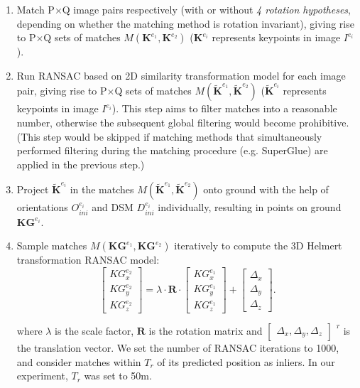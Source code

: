\begin{enumerate}
    \item Match P$\times$Q image pairs respectively (with or without \textit{4 rotation hypotheses}, depending on whether the matching method is rotation invariant), giving rise to P$\times$Q sets of matches $M({\mathbf{K}^{e_1},\mathbf{K}^{e_2}})$ ($\mathbf{K}^{e_i}$ represents keypoints in image $I^{e_i}$).
    \item Run RANSAC based on 2D similarity transformation model for each image pair, giving rise to P$\times$Q sets of matches $M({\mathbf{\widetilde{K}}^{e_1},\mathbf{\widetilde{K}}^{e_2}})$ ($\mathbf{\widetilde{K}}^{e_i}$ represents keypoints in image $I^{e_i}$). This step aims to filter matches into a reasonable number, otherwise the subsequent global filtering would become prohibitive. (This step would be skipped if matching methods that simultaneously performed filtering during the matching procedure (e.g. SuperGlue) are applied in the previous step.)
    \item Project $\mathbf{\widetilde{K}}^{e_i}$ in the matches $M({\mathbf{\widetilde{K}}^{e_1},\mathbf{\widetilde{K}}^{e_2}})$ onto ground with the help of orientations $O_{ini}^{e_i}$ and DSM $D_{ini}^{e_i}$ individually, resulting in points on ground $\mathbf{KG}^{e_i}$.
    \item Sample matches $M({\mathbf{KG}^{e_1},\mathbf{KG}^{e_2}})$ iteratively to compute the 3D Helmert transformation RANSAC model:
\begin{equation}
\left [ \begin{array}{c}
{KG}_x^{e_2}\\
{KG}_y^{e_2}\\
{KG}_z^{e_2}
\end{array}
\right ] =\lambda \cdot \mathbf{R} \cdot {\left [ \begin{array}{c}
    {KG}_x^{e_1}\\
    {KG}_y^{e_1}\\
    {KG}_z^{e_1}
    \end{array}
    \right ]} + \left [ \begin{array}{c}
\Delta_x\\
\Delta_y\\
\Delta_z
\end{array}
\right ]. \label{eq:2DSim}
\end{equation}
    
where $\lambda$ is the scale factor, $\mathbf{R}$ is the rotation matrix and $\left [ \begin{array}{c}
    \Delta_x, \Delta_y, \Delta_z
\end{array}
\right ]$ $^{^T}$ is the translation vector.
We set the number of RANSAC iterations to 1000, and consider matches within $T_r$ of its predicted position as inliers. In our experiment, {$T_r$ was set to 50m.}
\end{enumerate}

